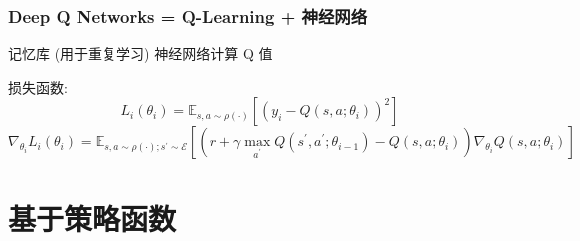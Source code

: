\documentclass{article}
\begin{document}
    	\subsubsection{Deep Q Networks = Q-Learning + 神经网络}
    	    记忆库 (用于重复学习)
            神经网络计算 Q 值
    	
            损失函数:
                $$L_{i}\left(\theta_{i}\right)=\mathbb{E}_{s, a \sim \rho(\cdot)}\left[\left(y_{i}-Q\left(s, a ; \theta_{i}\right)\right)^{2}\right]$$
                $$\nabla_{\theta_{i}} L_{i}\left(\theta_{i}\right)=\mathbb{E}_{s, a \sim \rho(\cdot) ; s^{\prime} \sim \mathcal{E}}\left[\left(r+\gamma \max _{a^{\prime}} Q\left(s^{\prime}, a^{\prime} ; \theta_{i-1}\right)-Q\left(s, a ; \theta_{i}\right)\right) \nabla_{\theta_{i}} Q\left(s, a ; \theta_{i}\right)\right]$$

\section{基于策略函数}
\end{document}
